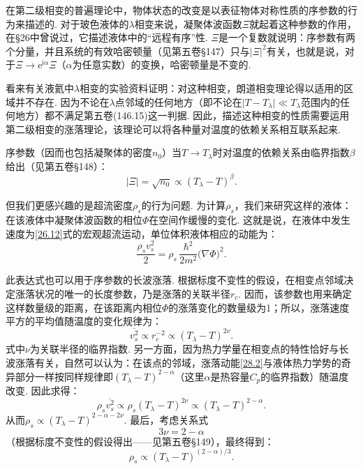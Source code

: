 在第二级相变的普遍理论中，物体状态的改变是以表征物体对称性质的序参数的行为来描述的. 对于玻色液体的$\lambda$相变来说，凝聚体波函数$\Xi$就起着这种参数的作用，在§26中曾说过，它描述液体中的“远程有序”性. $\Xi$是一个复数就说明：序参数有两个分量，并且系统的有效哈密顿量（见第五卷§147）只与$\vert\Xi\vert^{2}$有关，也就是说，对于$\Xi\to\mathrm{e}^{\mathrm{i}\alpha}\Xi$（$\alpha$为任意实数）的变换，哈密顿量是不变的.

看来有关液氦中$\lambda$相变的实验资料证明：对这种相变，朗道相变理论得以适用的区域并不存在. 因为不论在$\lambda$点邻域的任何地方（即不论在$\vert T-T_{\lambda}\vert\ll T_{\lambda}$范围内的任何地方）都不满足第五卷(146.15)这一判据. 因此，描述这种相变的性质需要运用第二级相变的涨落理论，该理论可以将各种量对温度的依赖关系相互联系起来.

序参数（因而也包括凝聚体的密度$n_{0}$）当$T\to T_{\lambda}$时对温度的依赖关系由临界指数$\beta$给出（见第五卷§148）：
\begin{equation}
\vert\Xi\vert=\sqrt{n_{0}}\propto(T_{\lambda}-T)^{\beta}.
\label{28.1}
\end{equation}

但我们更感兴趣的是超流密度$\rho_{s}$的行为问题. 为计算$\rho_{s}$，我们来研究这样的液体：在该液体中凝聚体波函数的相位$\Phi$在空间作缓慢的变化. 这就是说，在液体中发生速度为\eqref{26.12}式的宏观超流运动，单位体积液体相应的动能为：
\begin{equation}
\frac{\rho_{s}v_{s}^{2}}{2}=\rho_{s}\,\frac{\hbar^{2}}{2m^{2}}\bigl(\nabla\Phi\bigr)^{2}.
\label{28.2}
\end{equation}

此表达式也可以用于序参数的长波涨落. 根据标度不变性的假设，在相变点邻域决定涨落状况的唯一的长度参数，乃是涨落的关联半径$r_{c}$. 因而，该参数也用来确定这样数量级的距离，在该距离内相位$\Phi$的涨落变化的数量级为1；所以，涨落速度平方的平均值随温度的变化规律为：
\begin{equation*}
\overline{v_{s}^{2}}\propto r_{c}^{-2}\propto(T_{\lambda}-T)^{2\nu}.
\end{equation*}
式中$\nu$为关联半径的临界指数. 另一方面，因为热力学量在相变点的特性恰好与长波涨落有关，自然可以认为：在该点的邻域，涨落动能\eqref{28.2}与液体热力学势的奇异部分一样按同样规律即$(T_{\lambda}-T)^{2-\alpha}$（这里$\alpha$是热容量$C_{p}$的临界指数）随温度改变. 因此求得：
\begin{equation*}
\rho_{s}\overline{v_{s}^{2}}\propto\rho_{s}(T_{\lambda}-T)^{2\nu}\propto(T_{\lambda}-T)^{2-\alpha}.
\end{equation*}
从而$\rho_{s}\propto(T_{\lambda}-T)^{2-\alpha-2\nu}$. 最后，考虑关系式
\begin{equation}
3\nu=2-\alpha
\label{28.3}
\end{equation}
（根据标度不变性的假设得出——见第五卷§149），最终得到：
\begin{equation}
\rho_{s}\propto(T_{\lambda}-T)^{(2-\alpha)/3}.
\label{28.4}
\end{equation}

